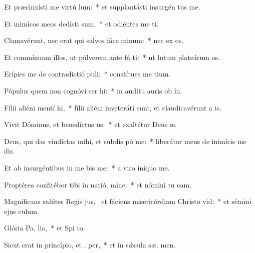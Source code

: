 \item Et præcinxísti me virtú  lum:~* et supplantásti insurgén   tus me.
\item Et inimícos meos dedísti  sum,~* et odiéntes me ti.
\item Clamavérunt, nec erat qui salvos fáce  minum:~* nec ex os.
\item Et commínuam illos, ut púlverem ante fá ti:~* ut lutum plateárum  os.
\item Erípies me de contradictió puli:~* constítues me   tium.
\item Pópulus quem non cognóvi ser hi:~* in audítu auris ob hi.
\item Fílii aliéni mentí  hi,~* fílii aliéni inveteráti sunt, et claudicavérunt a  is.
\item Vivit Dóminus, et benedíctus  us:~* et exaltétur Deus  æ.
\item Deus, qui das vindíctas mihi, et subdis pó  me:~* liberátor meus de inimícis me dis.
\item Et ab insurgéntibus in me bis me:~* a viro iníquo  me.
\item Proptérea confitébor tibi in natió, mine:~* et nómini tu  cam.
\item Magníficans salútes Regis jus,~\pscross{} et fáciens misericórdiam Christo  vid:~* et sémini ejus   culum.
\item Glória Pa,  lio,~* et Spi to.
\item Sicut erat in princípio, et ,  per,~* et in sǽcula sæ. men.
